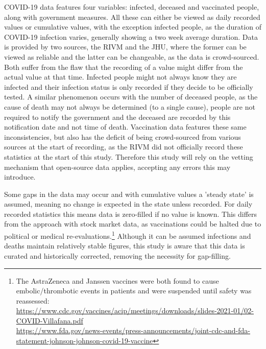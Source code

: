 COVID-19 data features four variables: infected, deceased and vaccinated people, along with government measures. All these can either be viewed as daily recorded values or cumulative values, with the exception infected people, as the duration of COVID-19 infection varies, generally showing a two week average duration. Data is provided by two sources, the RIVM and the JHU, where the former can be viewed as reliable and the latter can be changeable, as the data is crowd-sourced. Both suffer from the flaw that the recording of a value might differ from the actual value at that time. Infected people might not always know they are infected and their infection status is only recorded if they decide to be officially tested. A similar phenomenon occurs with the number of deceased people, as the cause of death may not always be determined (to a single cause), people are not required to notify the government and the deceased are recorded by this notification date and not time of death. Vaccination data features these same inconsistencies, but also has the deficit of being crowd-sourced from various sources at the start of recording, as the RIVM did not officially record these statistics at the start of this study. Therefore this study will rely on the vetting mechanism that open-source data applies, accepting any errors this may introduce.

Some gaps in the data may occur and with cumulative values a 'steady state' is assumed, meaning no change is expected in the state unless recorded. For daily recorded statistics this means data is zero-filled if no value is known. This differs from the approach with stock market data, as vaccinations could be halted due to political or medical re-evaluations.\footnote{The AstraZeneca and Janssen vaccines were both found to cause embolic/thrombotic events in patients and were suspended until safety was reassessed: \\ \url{https://www.cdc.gov/vaccines/acip/meetings/downloads/slides-2021-01/02-COVID-Villafana.pdf}\\  \url{https://www.fda.gov/news-events/press-announcements/joint-cdc-and-fda-statement-johnson-johnson-covid-19-vaccine}}
Although it can be assumed infections and deaths maintain relatively stable figures, this study is aware that this data is curated and historically corrected, removing the necessity for gap-filling.

